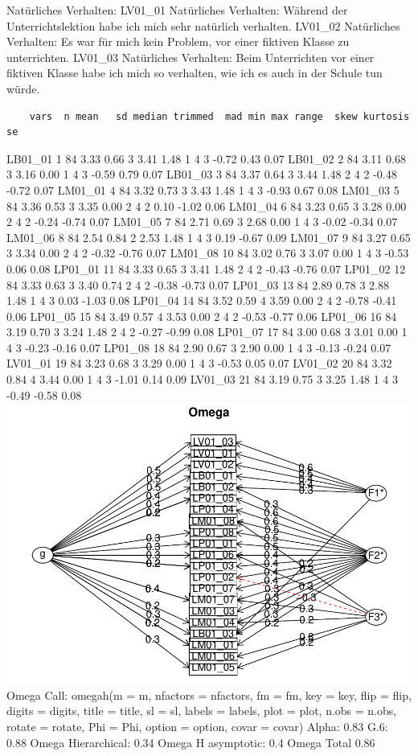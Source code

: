 \documentclass[
  man]{apa6}
\begin{document}
Natürliches Verhalten:
LV01\_01 Natürliches Verhalten: Während der Unterrichtslektion habe ich mich sehr natürlich verhalten.
LV01\_02 Natürliches Verhalten: Es war für mich kein Problem, vor einer fiktiven Klasse zu unterrichten.
LV01\_03 Natürliches Verhalten: Beim Unterrichten vor einer fiktiven Klasse habe ich mich so verhalten, wie ich es auch in der Schule tun würde.

\begin{verbatim}
    vars  n mean   sd median trimmed  mad min max range  skew kurtosis   se
\end{verbatim}

LB01\_01 1 84 3.33 0.66 3 3.41 1.48 1 4 3 -0.72 0.43 0.07
LB01\_02 2 84 3.11 0.68 3 3.16 0.00 1 4 3 -0.59 0.79 0.07
LB01\_03 3 84 3.37 0.64 3 3.44 1.48 2 4 2 -0.48 -0.72 0.07
LM01\_01 4 84 3.32 0.73 3 3.43 1.48 1 4 3 -0.93 0.67 0.08
LM01\_03 5 84 3.36 0.53 3 3.35 0.00 2 4 2 0.10 -1.02 0.06
LM01\_04 6 84 3.23 0.65 3 3.28 0.00 2 4 2 -0.24 -0.74 0.07
LM01\_05 7 84 2.71 0.69 3 2.68 0.00 1 4 3 -0.02 -0.34 0.07
LM01\_06 8 84 2.54 0.84 2 2.53 1.48 1 4 3 0.19 -0.67 0.09
LM01\_07 9 84 3.27 0.65 3 3.34 0.00 2 4 2 -0.32 -0.76 0.07
LM01\_08 10 84 3.02 0.76 3 3.07 0.00 1 4 3 -0.53 0.06 0.08
LP01\_01 11 84 3.33 0.65 3 3.41 1.48 2 4 2 -0.43 -0.76 0.07
LP01\_02 12 84 3.33 0.63 3 3.40 0.74 2 4 2 -0.38 -0.73 0.07
LP01\_03 13 84 2.89 0.78 3 2.88 1.48 1 4 3 0.03 -1.03 0.08
LP01\_04 14 84 3.52 0.59 4 3.59 0.00 2 4 2 -0.78 -0.41 0.06
LP01\_05 15 84 3.49 0.57 4 3.53 0.00 2 4 2 -0.53 -0.77 0.06
LP01\_06 16 84 3.19 0.70 3 3.24 1.48 2 4 2 -0.27 -0.99 0.08
LP01\_07 17 84 3.00 0.68 3 3.01 0.00 1 4 3 -0.23 -0.16 0.07
LP01\_08 18 84 2.90 0.67 3 2.90 0.00 1 4 3 -0.13 -0.24 0.07
LV01\_01 19 84 3.23 0.68 3 3.29 0.00 1 4 3 -0.53 0.05 0.07
LV01\_02 20 84 3.32 0.84 4 3.44 0.00 1 4 3 -1.01 0.14 0.09
LV01\_03 21 84 3.19 0.75 3 3.25 1.48 1 4 3 -0.49 -0.58 0.08
\includegraphics{paper_methods_files/figure-latex/presence_questionnaire-1.pdf} Omega
Call: omegah(m = m, nfactors = nfactors, fm = fm, key = key, flip = flip,
digits = digits, title = title, sl = sl, labels = labels,
plot = plot, n.obs = n.obs, rotate = rotate, Phi = Phi, option = option,
covar = covar)
Alpha: 0.83
G.6: 0.88
Omega Hierarchical: 0.34
Omega H asymptotic: 0.4
Omega Total 0.86
\end{document}
